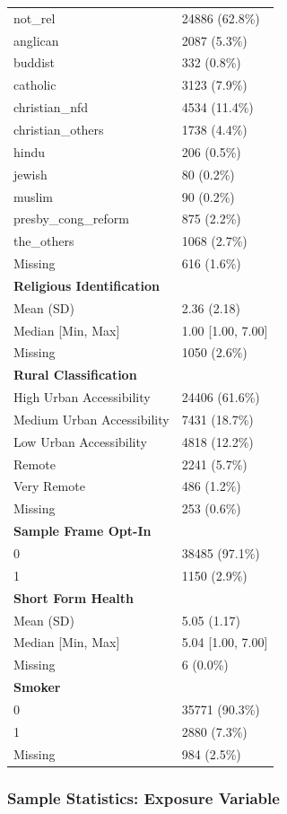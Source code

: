 \documentclass[
  single column]{article}
\begin{document}
\begin{longtable}[]{@{}ll@{}}
not\_rel & 24886 (62.8\%) \\
anglican & 2087 (5.3\%) \\
buddist & 332 (0.8\%) \\
catholic & 3123 (7.9\%) \\
christian\_nfd & 4534 (11.4\%) \\
christian\_others & 1738 (4.4\%) \\
hindu & 206 (0.5\%) \\
jewish & 80 (0.2\%) \\
muslim & 90 (0.2\%) \\
presby\_cong\_reform & 875 (2.2\%) \\
the\_others & 1068 (2.7\%) \\
Missing & 616 (1.6\%) \\
\textbf{Religious Identification} & \\
Mean (SD) & 2.36 (2.18) \\
Median {[}Min, Max{]} & 1.00 {[}1.00, 7.00{]} \\
Missing & 1050 (2.6\%) \\
\textbf{Rural Classification} & \\
High Urban Accessibility & 24406 (61.6\%) \\
Medium Urban Accessibility & 7431 (18.7\%) \\
Low Urban Accessibility & 4818 (12.2\%) \\
Remote & 2241 (5.7\%) \\
Very Remote & 486 (1.2\%) \\
Missing & 253 (0.6\%) \\
\textbf{Sample Frame Opt-In} & \\
0 & 38485 (97.1\%) \\
1 & 1150 (2.9\%) \\
\textbf{Short Form Health} & \\
Mean (SD) & 5.05 (1.17) \\
Median {[}Min, Max{]} & 5.04 {[}1.00, 7.00{]} \\
Missing & 6 (0.0\%) \\
\textbf{Smoker} & \\
0 & 35771 (90.3\%) \\
1 & 2880 (7.3\%) \\
Missing & 984 (2.5\%) \\
\end{longtable}

\subsubsection{Sample Statistics: Exposure
Variable}\label{appendix-exposure}
\end{document}

